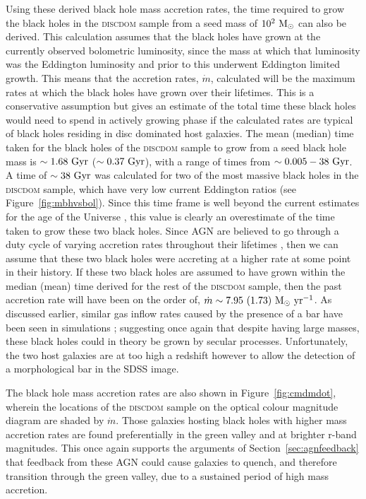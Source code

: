 {Using these derived black hole mass accretion rates, the time required to grow the black holes in the \textsc{discdom} sample from a seed mass of $10^2 ~\rm{M}_{\odot}$ can also be derived. This calculation assumes that the black holes have grown at the currently observed bolometric luminosity, since the mass at which that luminosity was the Eddington luminosity and prior to this underwent Eddington limited growth. This means that the accretion rates, $\dot{m}$, calculated will be the maximum rates at which the black holes have grown over their lifetimes. This is a conservative assumption but gives an estimate of the total time these black holes would need to spend in actively growing phase if the calculated rates are typical of black holes residing in disc dominated host galaxies. The mean (median) time taken for the black holes of the \textsc{discdom} sample to grow from a seed black hole mass is $\sim 1.68 ~\rm{Gyr}$ ($\sim 0.37 ~\rm{Gyr}$), with a range of times from $\sim 0.005 - 38 ~\rm{Gyr}$. A time of $\sim 38 ~\rm{Gyr}$ was calculated for two of the most massive black holes in the \textsc{discdom} sample, which have very low current Eddington ratios (see Figure~\ref{fig:mbhvsbol}). Since this time frame is well beyond the current estimates for the age of the Universe \citep{}, this value is clearly an overestimate of the time taken to grow these two black holes. Since AGN are believed to go through a duty cycle of varying accretion rates throughout their lifetimes \citep{ref,ref, ref, schawinski16}, then we can assume that these two black holes were accreting at a higher rate at some point in their history. If these two black holes are assumed to have grown within the median (mean) time derived for the rest of the \textsc{discdom} sample, then the past accretion rate will have been on the order of, $\dot{m} \sim 7.95 ~(1.73) ~\rm{M}_{\odot}~\rm{yr}^{-1}$. As discussed earlier, similar gas inflow rates caused by the presence of a bar have been seen in simulations \citep{friedli93, emsellem05}; suggesting once again that despite having large masses, these black holes could in theory be grown by secular processes. Unfortunately, the two host galaxies are at too high a redshift however to allow the detection of a morphological bar in the SDSS image. 

The black hole mass accretion rates are also shown in Figure~\ref{fig:cmdmdot}, wherein the locations of the \textsc{discdom} sample on the optical colour magnitude diagram are shaded by $\dot{m}$. Those galaxies hosting black holes with higher mass accretion rates are found preferentially in the green valley and at brighter r-band magnitudes. This once again supports the arguments of Section~\ref{sec:agnfeedback} that feedback from these AGN could cause galaxies to quench, and therefore transition through the green valley, due to a sustained period of high mass accretion.

}
